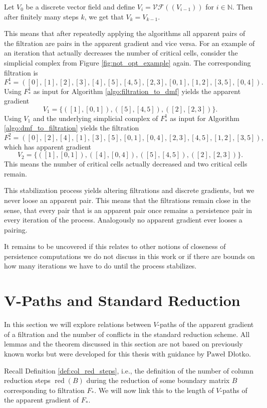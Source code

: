 \begin{corl}
Let $V_0$ be a discrete vector field and define $V_i = \mathcal{V}\mathcal{F}((V_{i-1}))$ for $i\in \mathbb{N}$. Then after finitely many steps $k$, we get that $V_k = V_{k-1}$.
\end{corl}
 
This means that after repeatedly applying the algorithms  all apparent pairs of the filtration are pairs in the apparent gradient and vice versa. For an example of an iteration that actually decreases the number of critical cells, consider the simplicial complex from Figure \ref{fig:not_opt_example} again. The corresponding filtration is  \[
F_*^1 = ([0],[1],[2],[3],[4],[5],[4,5],[2,3],[0,1],[1,2],[3,5],[0,4]).
\]
Using $F_*^1$ as input for Algorithm \ref{algo:filtration_to_dmf} yields the apparent gradient \[V_1 = \{([1],[0,1]),([5],[4,5]),([2],[2,3])\}.\] Using $V_1$ and the underlying simplicial complex of $F_*^1$ as input for Algorithm \ref{algo:dmf_to_filtration} yields the filtration \[
F_*^2 = ([0], [2], [4], [1], [3], [5], [0, 1], [0, 4], [2, 3], [4, 5], [1, 2], [3, 5]),
\]
which has apparent gradient \[V_2 = \{([1],[0,1]),([4],[0,4]),([5],[4,5]),([2],[2,3])\}.\] This means the number of critical cells actually decreased and two critical cells remain.

This stabilization process yields altering filtrations and discrete gradients, but we never loose an apparent pair. This means that the filtrations remain close in the sense, that every pair that is an apparent pair once remains a persistence pair in every iteration of the process. Analogously no apparent gradient ever looses a pairing. 

It remains to be uncovered if this relates to other notions of closeness of persistence computations we do not discuss in this work or if there are bounds on how many iterations we have to do until the process stabilizes. 

\section{V-Paths and Standard Reduction}
In this section we will explore relations between $V$-paths of the apparent gradient of a filtration and the number of conflicts in the standard reduction scheme. All lemmas and the theorem discussed in this section are not based on previously known works but were developed for this thesis with guidance by $\text{Pawe\l}$ $\text{D\l otko}$.

Recall Definition \ref{def:col_red_steps}, i.e., the definition of the number of column reduction steps $\operatorname{red}(B)$ during the reduction of some boundary matrix $B$ corresponding to filtration $F_*$. We will now link this to the length of $V$-paths of the apparent gradient of $F_*$.


